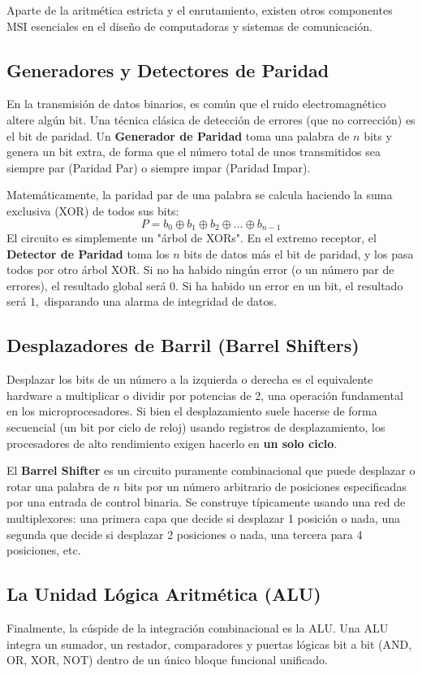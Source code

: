 Aparte de la aritmética estricta y el enrutamiento, existen otros componentes MSI esenciales en el diseño de computadoras y sistemas de comunicación.

\subsection{Generadores y Detectores de Paridad}
En la transmisión de datos binarios, es común que el ruido electromagnético altere algún bit. Una técnica clásica de detección de errores (que no corrección) es el bit de paridad. 
Un \textbf{Generador de Paridad} toma una palabra de $n$ bits y genera un bit extra, de forma que el número total de unos transmitidos sea siempre par (Paridad Par) o siempre impar (Paridad Impar).

Matemáticamente, la paridad par de una palabra se calcula haciendo la suma exclusiva (XOR) de todos sus bits:
\[ P = b_0 \oplus b_1 \oplus b_2 \oplus \dots \oplus b_{n-1} \]
El circuito es simplemente un "árbol de XORs". En el extremo receptor, el \textbf{Detector de Paridad} toma los $n$ bits de datos más el bit de paridad, y los pasa todos por otro árbol XOR. Si no ha habido ningún error (o un número par de errores), el resultado global será $0.$ Si ha habido un error en un bit, el resultado será $1,$ disparando una alarma de integridad de datos.

\subsection{Desplazadores de Barril (Barrel Shifters)}
Desplazar los bits de un número a la izquierda o derecha es el equivalente hardware a multiplicar o dividir por potencias de 2, una operación fundamental en los microprocesadores. 
Si bien el desplazamiento suele hacerse de forma secuencial (un bit por ciclo de reloj) usando registros de desplazamiento, los procesadores de alto rendimiento exigen hacerlo en \textbf{un solo ciclo}.

El \textbf{Barrel Shifter} es un circuito puramente combinacional que puede desplazar o rotar una palabra de $n$ bits por un número arbitrario de posiciones especificadas por una entrada de control binaria. Se construye típicamente usando una red de multiplexores: una primera capa que decide si desplazar 1 posición o nada, una segunda que decide si desplazar 2 posiciones o nada, una tercera para 4 posiciones, etc.

\subsection{La Unidad Lógica Aritmética (ALU)}
Finalmente, la cúspide de la integración combinacional es la ALU. Una ALU integra un sumador, un restador, comparadores y puertas lógicas bit a bit (AND, OR, XOR, NOT) dentro de un único bloque funcional unificado.

